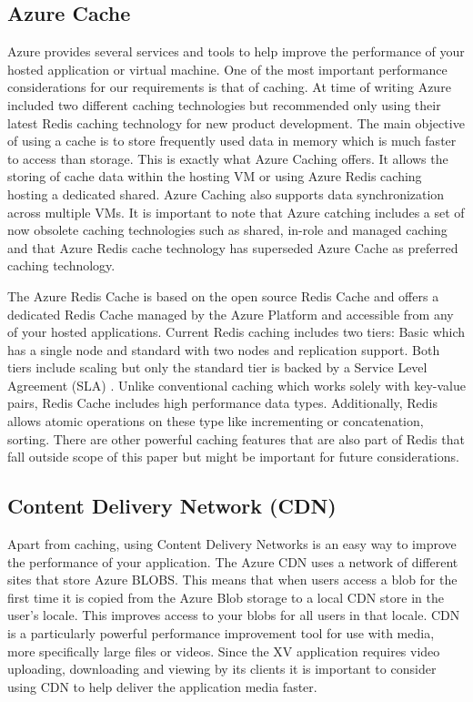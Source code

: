 \subsection{Azure Cache}

Azure provides several services and tools to help improve the performance of your hosted application or virtual machine. One of the most important performance considerations for our requirements is that of caching. At time of writing Azure included two different caching technologies but recommended only using their latest Redis caching technology for new product development. The main objective of using a cache is to store frequently used data in memory which is much faster to access than storage. This is exactly what Azure Caching offers. It allows the storing of cache data within the hosting VM or using Azure Redis caching hosting a dedicated shared. Azure Caching also supports data synchronization across multiple VMs. It is important to note that Azure catching includes a set of now obsolete caching technologies such as shared, in-role and managed caching \cite{Microsoft_Corporation_undated-ej} and that Azure Redis cache technology has superseded Azure Cache as preferred caching technology.

The Azure Redis Cache is based on the open source Redis Cache and offers a dedicated Redis Cache managed by the Azure Platform and accessible from any of your hosted applications. Current Redis caching includes two tiers: Basic which has a single node and standard with two nodes and replication support. Both tiers include scaling but only the standard tier is backed by a Service Level Agreement (SLA) \cite{Azure_Redis}. Unlike conventional caching which works solely with key-value pairs, Redis Cache includes high performance data types. Additionally, Redis allows atomic operations on these type like incrementing or concatenation, sorting. There are other powerful caching features that are also part of Redis that fall outside scope of this paper but might be important for future considerations.

\subsection{Content Delivery Network (CDN)}

Apart from caching, using Content Delivery Networks is an easy way to improve the performance of your application. The Azure CDN uses a network of different sites that store Azure BLOBS. This means that when users access a blob for the first time it is copied from the Azure Blob storage to a local CDN store in the user's locale. This improves access to your blobs for all users in that locale. CDN is a particularly powerful performance improvement tool for use with media, more specifically large files or videos. Since the XV application requires video uploading, downloading and viewing by its clients it is important to consider using CDN to help deliver the application media faster.




